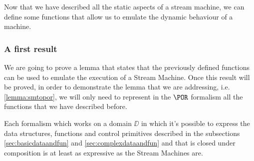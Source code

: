 Now that we have described all the static aspects of a stream machine, we can define some functions that allow us to emulate the dynamic behaviour of a machine.

\subsubsection{A first result}

We are going to prove a lemma that states that the previously defined functions can be used to emulate the execution of a Stream Machine. Once this result will be proved, in order to demonstrate the lemma that we are addressing, i.e. \ref{lemma:smtopor}, we will only need to represent in the $\POR$ formalism all the functions that we have described before.

\begin{lemma}
\label{lemma:sfpimpl}
Each formalism which works on a domain $\DD$ in which it's possible to express the data structures, functions and control primitives described in the subsections \ref{sec:basicdataandfun} and \ref{sec:complexdataandfun} and that is closed under composition is at least as expressive as the Stream Machines are.
\end{lemma}

